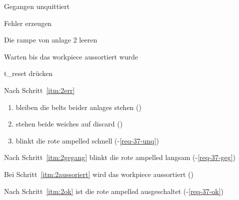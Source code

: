 \begin{ablauf}{Gegangen unquittiert}
    \item \label{itm:2err} Fehler erzeugen
    \item\label{itm:2gegang} Die \gls{rampe} von \gls{anlage} 2 leeren
    \item\label{itm:2aussoriert} Warten bis das \gls{workpiece} aussortiert wurde
    \item\label{itm:2ok} \gls{t_reset} drücken
\end{ablauf}
\begin{erwartung}
    \item Nach Schritt~\ref{itm:2err}
    \begin{enumerate}
        \item bleiben die \glspl{belt} beider \glspl{anlage} stehen ()
        \item stehen beide \glspl{weiche} auf \gls{discard} ()
        \item blinkt die rote \gls{ampelled} schnell (-\ref{req-37-unq})
    \end{enumerate}
    \item Nach Schritt~\ref{itm:2gegang} blinkt die rote \gls{ampelled} langsam (-\ref{req-37-geg})
    \item Bei Schritt~\ref{itm:2aussoriert} wird das \gls{workpiece} aussortiert ()
    \item Nach Schritt~\ref{itm:2ok} ist die rote \gls{ampelled} ausgeschaltet (-\ref{req-37-ok})
\end{erwartung}
